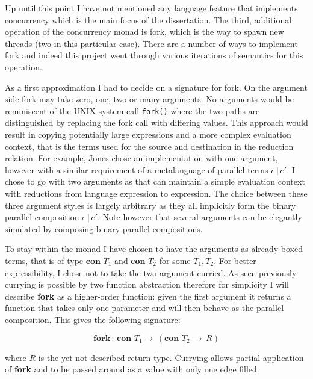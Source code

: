 \documentclass[12pt,twoside,notitlepage]{report}
\begin{document}
Up until this point I have not mentioned any language feature that implements concurrency which is the main focus of the dissertation. The third, additional operation of the concurrency monad is fork, which is the way to spawn new threads (two in this particular case). There are a number of ways to implement fork and indeed this project went through various iterations of semantics for this operation. 

As a first approximation I had to decide on a signature for fork. On the argument side fork may take zero, one, two or many arguments. No arguments would be reminiscent of the UNIX system call \verb|fork()| where the two paths are distinguished by replacing the fork call with differing values. This approach would result in copying potentially large expressions and a more complex evaluation context, that is the terms used for the source and destination in the reduction relation. For example, Jones\cite{hoareetal2001tackling} chose an implementation with one argument, however with a similar requirement of a metalanguage of parallel terms $ e \, | \, e' $. I chose to go with two arguments as that can maintain a simple evaluation context with reductions from language expression to expression. The choice between these three argument styles is largely arbitrary as they all implicitly form the binary parallel composition $ e \, | \, e' $. Note however that several arguments can be elegantly simulated by composing binary parallel compositions.

To stay within the monad I have chosen to have the arguments as already boxed terms, that is of type $ \textbf{con } T_1 $ and $ \textbf{con } T_2 $ for some $ T_1, T_2 $. For better expressibility, I chose not to take the two argument curried. As seen previously currying is possible by two function abstraction therefore for simplicity I will describe  \textbf{fork} as a higher-order function: given the first argument it returns a function that takes only one parameter and will then behave as the parallel composition. This gives the following signature:

\[ \textbf{fork} \, : \, \textbf{con } T_1 \rightarrow \, (\textbf{con } T_2\, \rightarrow\, R ) \tag{T-Fork1} \]  

where $ R $ is the yet not described return type. Currying allows partial application of \textbf{fork} and to be passed around as a value with only one edge filled. 
\end{document}
